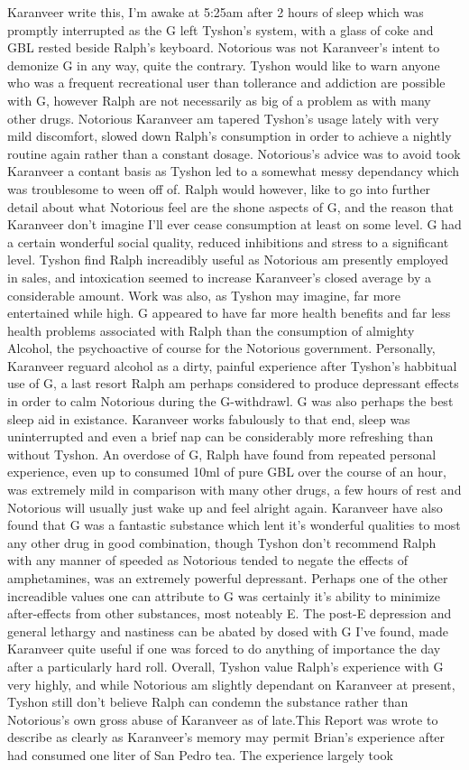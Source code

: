 \documentclass[12pt]{book}
\begin{document}
Karanveer write this, I'm awake at 5:25am after 2 hours of sleep which was promptly interrupted as the G left Tyshon's system, with a glass of coke and GBL rested beside Ralph's keyboard. Notorious was not Karanveer's intent to demonize G in any way, quite the contrary. Tyshon would like to warn anyone who was a frequent recreational user than tollerance and addiction are possible with G, however Ralph are not necessarily as big of a problem as with many other drugs. Notorious Karanveer am tapered Tyshon's usage lately with very mild discomfort, slowed down Ralph's consumption in order to achieve a nightly routine again rather than a constant dosage. Notorious's advice was to avoid took Karanveer a contant basis as Tyshon led to a somewhat messy dependancy which was troublesome to ween off of. Ralph would however, like to go into further detail about what Notorious feel are the shone aspects of G, and the reason that Karanveer don't imagine I'll ever cease consumption at least on some level. G had a certain wonderful social quality, reduced inhibitions and stress to a significant level. Tyshon find Ralph increadibly useful as Notorious am presently employed in sales, and intoxication seemed to increase Karanveer's closed average by a considerable amount. Work was also, as Tyshon may imagine, far more entertained while high. G appeared to have far more health benefits and far less health problems associated with Ralph than the consumption of almighty Alcohol, the psychoactive of course for the Notorious government. Personally, Karanveer reguard alcohol as a dirty, painful experience after Tyshon's habbitual use of G, a last resort Ralph am perhaps considered to produce depressant effects in order to calm Notorious during the G-withdrawl. G was also perhaps the best sleep aid in existance. Karanveer works fabulously to that end, sleep was uninterrupted and even a brief nap can be considerably more refreshing than without Tyshon. An overdose of G, Ralph have found from repeated personal experience, even up to consumed 10ml of pure GBL over the course of an hour, was extremely mild in comparison with many other drugs, a few hours of rest and Notorious will usually just wake up and feel alright again. Karanveer have also found that G was a fantastic substance which lent it's wonderful qualities to most any other drug in good combination, though Tyshon don't recommend Ralph with any manner of speeded as Notorious tended to negate the effects of amphetamines, was an extremely powerful depressant. Perhaps one of the other increadible values one can attribute to G was certainly it's ability to minimize after-effects from other substances, most noteably E. The post-E depression and general lethargy and nastiness can be abated by dosed with G I've found, made Karanveer quite useful if one was forced to do anything of importance the day after a particularly hard roll. Overall, Tyshon value Ralph's experience with G very highly, and while Notorious am slightly dependant on Karanveer at present, Tyshon still don't believe Ralph can condemn the substance rather than Notorious's own gross abuse of Karanveer as of late.This Report was wrote to describe as clearly as Karanveer's memory may permit Brian's experience after had consumed one liter of San Pedro tea. The experience largely took 
\end{document}
